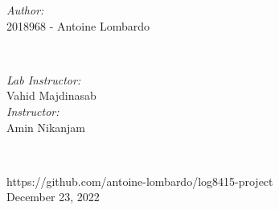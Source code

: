 \begin{titlepage}
\begin{minipage}{0.4\textwidth}
\begin{flushleft} \large
\emph{Author:}\\
2018968 - Antoine Lombardo\\[1.2em]
\end{flushleft}
\end{minipage}
~
\begin{minipage}{0.4\textwidth}
\begin{flushright} \large
\emph{Lab Instructor:} \\
Vahid Majdinasab  \\[1.2em] %
\emph{Instructor:} \\
Amin Nikanjam %
\end{flushright}
\end{minipage}\\[2cm]
\makeatother


{\large https://github.com/antoine-lombardo/log8415-project}\\[2cm]


{\large December 23, 2022}\\[2cm] %

\vfill %

\end{titlepage}